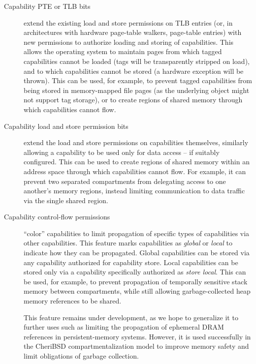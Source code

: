 \begin{description}

\item[Capability PTE or TLB bits] extend the existing load and store
  permissions on TLB entries (or, in architectures with hardware page-table walkers,
  page-table entries) with new permissions to authorize loading and storing
  of capabilities.
  This allows the operating system to maintain pages from which tagged
  capabilities cannot be loaded (tags will be transparently stripped on load),
  and to which capabilities cannot be stored (a hardware exception will be
  thrown).
  This can be used, for example, to prevent tagged capabilities from being
  stored in memory-mapped file pages (as the underlying object might not
  support tag storage), or to create regions of shared memory through which
  capabilities cannot flow.

\item[Capability load and store permission bits] extend the load and store
  permissions on capabilities themselves, similarly allowing a capability to
  be used only for data access -- if suitably configured.
  This can be used to create regions of shared memory within an address
  space through which capabilities cannot flow.
  For example, it can 
prevent
  two separated compartments from
  delegating access to one another's memory regions, instead limiting
  communication to data traffic via the single shared region.

\item[Capability control-flow permissions] ``color'' capabilities to limit
  propagation of specific types of capabilities via other capabilities.
  This feature marks capabilities as \textit{global} or \textit{local} to
  indicate how they can be propagated.
  Global capabilities can be stored via any capability authorized for
  capability store.
  Local capabilities can be stored only via a capability specifically
  authorized as \textit{store local}.
  This can be used, for example, to prevent propagation of temporally
  sensitive stack memory between compartments, while still allowing
  garbage-collected heap memory references to be shared.

  This feature remains under development, as we hope to generalize it to
  further uses such as limiting the propagation of ephemeral DRAM references
  in persistent-memory systems.
However, it
  is used successfully in the CheriBSD
  compartmentalization model to improve memory safety and limit obligations of
  garbage collection.

\end{description}

